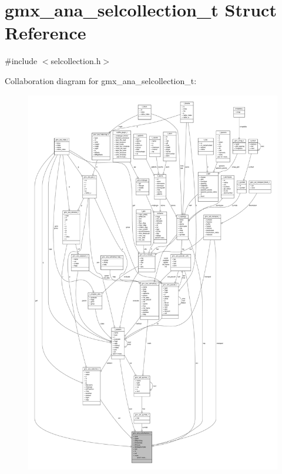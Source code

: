 \hypertarget{structgmx__ana__selcollection__t}{\section{gmx\-\_\-ana\-\_\-selcollection\-\_\-t \-Struct \-Reference}
\label{structgmx__ana__selcollection__t}
}


{\ttfamily \#include $<$selcollection.\-h$>$}



\-Collaboration diagram for gmx\-\_\-ana\-\_\-selcollection\-\_\-t\-:
\nopagebreak
\begin{figure}[H]
\begin{center}
\leavevmode
\includegraphics[width=350pt]{structgmx__ana__selcollection__t__coll__graph}
\end{center}
\end{figure}
